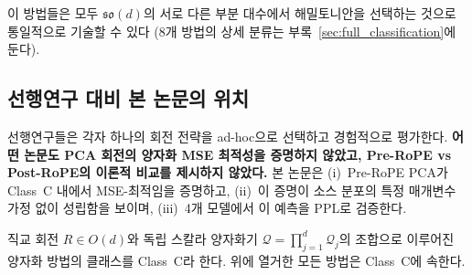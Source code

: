 이 방법들은 모두 $\mathfrak{so}(d)$의 서로 다른 부분 대수에서 해밀토니안을 선택하는 것으로 통일적으로 기술할 수 있다 (8개 방법의 상세 분류는 부록~\ref{sec:full_classification}에 둔다).

\subsection{선행연구 대비 본 논문의 위치}

선행연구들은 각자 하나의 회전 전략을 ad-hoc으로 선택하고 경험적으로 평가한다. \textbf{어떤 논문도 PCA 회전의 양자화 MSE 최적성을 증명하지 않았고, Pre-RoPE vs Post-RoPE의 이론적 비교를 제시하지 않았다.} 본 논문은 (i)~Pre-RoPE PCA가 Class~C 내에서 MSE-최적임을 증명하고, (ii)~이 증명이 소스 분포의 특정 매개변수 가정 없이 성립함을 보이며, (iii)~4개 모델에서 이 예측을 PPL로 검증한다.

\begin{definition}[Class~C]
\label{def:classC}
직교 회전 $R \in O(d)$와 독립 스칼라 양자화기 $\mathcal{Q} = \prod_{j=1}^{d} \mathcal{Q}_j$의 조합으로 이루어진 양자화 방법의 클래스를 Class~C라 한다. 위에 열거한 모든 방법은 Class~C에 속한다.
\end{definition}
